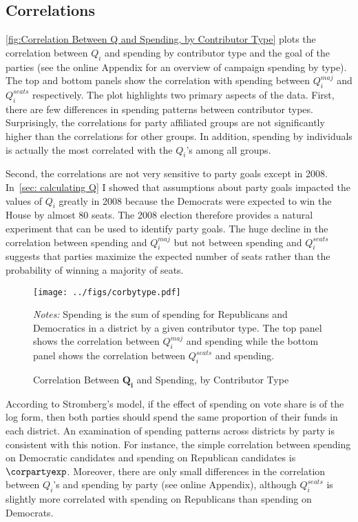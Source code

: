 \documentclass[12pt,final,fleqn]{article}
\theoremstyle{plain}
\begin{document}
\subsection{Correlations}
\autoref{fig:Correlation Between Q and Spending, by Contributor Type} plots the correlation between $Q_i$ and spending by contributor type and the goal of the parties (see the online Appendix for an overview of campaign spending by type). The top and bottom panels show the correlation with spending between $Q_i^{maj}$ and $Q_i^{seats}$ respectively. The plot highlights two primary aspects of the data. First, there are few differences in spending patterns between contributor types. Surprisingly, the correlations for party affiliated groups are not significantly higher than the correlations for other groups. In addition, spending by individuals is actually the most correlated with the $Q_i$'s among all groups. 

Second, the correlations are not very sensitive to party goals except in 2008. In~\autoref{sec: calculating Q} I showed that assumptions about party goals impacted the values of $Q_i$ greatly in 2008 because the Democrats were expected to win the House by almost 80 seats. The 2008 election therefore provides a natural experiment that can be used to identify party goals. The huge decline in the correlation between spending and $Q_i^{maj}$ but not between spending and $Q_i^{seats}$ suggests that parties maximize the expected number of seats rather than the probability of winning a majority of seats. 

\begin{figure}[!htb]
\texttt{[image: ../figs/corbytype.pdf]}
\vspace{.5cm}
\caption{Correlation Between $\mathbf{Q_i}$ and Spending, by Contributor Type}
\label{fig:Correlation Between Q and Spending, by Contributor Type}
\begin{minipage}{\linewidth}
\footnotesize
\emph{Notes:} Spending is the sum of spending for Republicans and Democratics in a district by a given contributor type. The top panel shows the correlation between $Q_i^{maj}$ and spending while the bottom panel shows the correlation between $Q_i^{seats}$ and spending.
\end{minipage}
\end{figure}

According to Stromberg's model, if the effect of spending on vote share is of the log form, then both parties should spend the same proportion of their funds in each district. An examination of spending patterns across districts by party is consistent with this notion. For instance, the simple correlation between spending on Democratic candidates and spending on Republican candidates is $\corpartyexp$. Moreover, there are only small differences in the correlation between $Q_i$'s and spending by party (see online Appendix), although $Q_i^{seats}$ is slightly more correlated with spending on Republicans than spending on Democrats.
\end{document}
